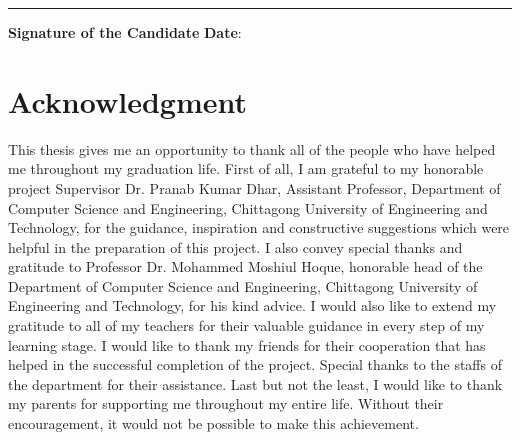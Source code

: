 %

\noindent\rule{5.7cm}{0.4pt}

\noindent\textbf{Signature of the Candidate} \newline \textbf{Date}:

\newpage

\section*{Acknowledgment}
This thesis gives me an opportunity to thank all of the people who have helped me throughout my graduation life. First of all, I am grateful to my honorable project Supervisor Dr. Pranab Kumar Dhar, Assistant Professor, Department of Computer Science and Engineering, Chittagong University of Engineering and Technology, for the guidance, inspiration and constructive suggestions which were helpful in the preparation of this project. I also convey special thanks and gratitude to Professor Dr. Mohammed Moshiul Hoque, honorable head of the Department of Computer Science and Engineering, Chittagong University of Engineering and Technology, for his kind advice. I would also like to extend my gratitude to all of my teachers for their valuable guidance in every step of my learning stage. I would like to thank my friends for their cooperation that has helped in the successful completion of the project. Special thanks to the staffs of the department for their assistance. Last but not the least, I would like to thank my parents for supporting me throughout my entire life. Without their encouragement, it would not be possible to make this achievement.

\newpage

